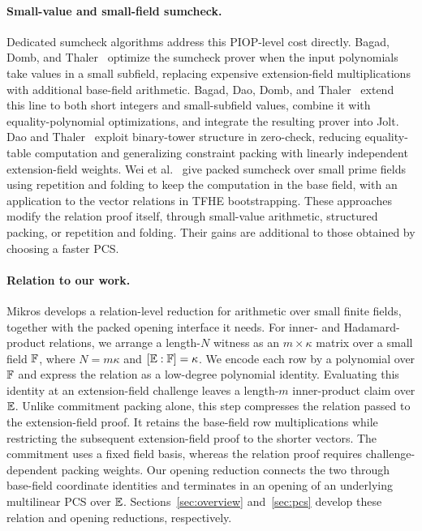 \paragraph{Small-value and small-field sumcheck.}
Dedicated sumcheck algorithms address this PIOP-level cost directly.
Bagad, Domb, and Thaler~\cite{iacr/BagadDT24} optimize the sumcheck
prover when the input polynomials take values in a small subfield,
replacing expensive extension-field multiplications with additional
base-field arithmetic.
Bagad, Dao, Domb, and Thaler~\cite{iacr/BagadDDT25} extend this line
to both short integers and small-subfield values, combine it with
equality-polynomial optimizations, and integrate the resulting prover
into Jolt.
Dao and Thaler~\cite{iacr/DaoT24} exploit binary-tower structure in
zero-check, reducing equality-table computation and generalizing
constraint packing with linearly independent extension-field weights.
Wei et al.~\cite{iacr/WeiWXZDWZ25} give packed sumcheck over small
prime fields using repetition and folding to keep the computation
in the base field, with an application to the vector relations in
TFHE bootstrapping.
These approaches modify the relation proof itself, through
small-value arithmetic, structured packing, or repetition and folding.
Their gains are additional to those obtained by choosing a faster PCS.

\paragraph{Relation to our work.}
Mikros develops a relation-level reduction for arithmetic over small
finite fields, together with the packed opening interface it needs.
For inner- and Hadamard-product relations, we arrange a length-\(N\)
witness as an \(m\times\kappa\) matrix over a small field
\({\mathbb{F}}\), where \(N=m\kappa\) and
\([\mathbb{E}:{\mathbb{F}}]=\kappa\).
We encode each row by a polynomial over \({\mathbb{F}}\) and express the
relation as a low-degree polynomial identity.
Evaluating this identity at an extension-field challenge leaves a
length-\(m\) inner-product claim over \(\mathbb{E}\).
Unlike commitment packing alone, this step compresses the relation
passed to the extension-field proof.
It retains the base-field row multiplications while
restricting the subsequent extension-field proof to the shorter
vectors.
The commitment uses a fixed field basis, whereas the relation proof
requires challenge-dependent packing weights.
Our opening reduction connects the two through base-field coordinate
identities and terminates in an opening of an underlying multilinear
PCS over \(\mathbb{E}\).
Sections~\ref{sec:overview} and~\ref{sec:pcs} develop these
relation and opening reductions, respectively.
